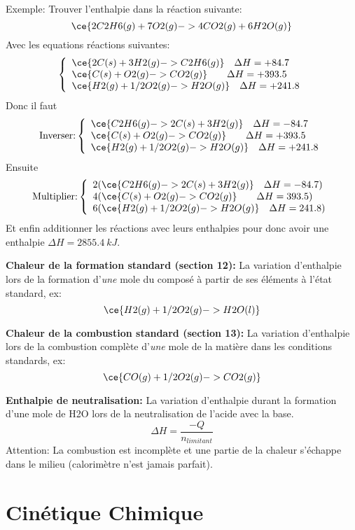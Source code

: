 \documentclass[french, a4paper, 12pt]{article}
\begin{document}
Exemple: Trouver l'enthalpie dans la réaction suivante:
\[
\ce{2C2H6(g) + 7 O2(g) -> 4CO2(g) + 6H2O(g)}
\]
Avec les equations réactions suivantes:
\[
\left\{
	\begin{array}{ll}
		\ce{2C(s) + 3H2(g) -> C2H6(g)}\quad \Delta H=+84.7\\
		\ce{C(s) + O2(g) -> CO2(g)}\qquad \Delta H=+393.5\\
		\ce{H2(g) + 1/2O2 (g) -> H2O(g)} \quad \Delta H=+241.8
	\end{array}
\right.
\]
Donc il faut
\[
\text{Inverser:}\left\{
	\begin{array}{ll}
		\ce{C2H6(g) -> 2C(s) + 3H2(g)}\quad \Delta H=-84.7\\
		\ce{C(s) + O2(g) -> CO2(g)}\qquad \Delta H=+393.5\\
		\ce{H2(g) + 1/2O2 (g) -> H2O(g)} \quad \Delta H=+241.8
	\end{array}
\right.
\]
Ensuite
\[
\text{Multiplier:}\left\{
	\begin{array}{ll}
		2(\ce{C2H6(g) -> 2C(s) + 3H2(g)}\quad \Delta H=-84.7)\\
		4(\ce{C(s) + O2(g) -> CO2(g)}\qquad \Delta H=393.5)\\
		6(\ce{H2(g) + 1/2O2 (g) -> H2O(g)} \quad \Delta H=241.8)
	\end{array}
\right.
\]
Et enfin additionner les réactions avec leurs enthalpies pour donc avoir une enthalpie $\Delta H=\SI{2855.4}{kJ}$.

\vspace{0.5em}
\textbf{Chaleur de la formation standard (section 12):}
La variation d'enthalpie lors de la formation d'\emph{une} mole du composé à partir de ses éléments à l'état standard, ex:
\[
\ce{H2(g) + 1/2O2(g) -> H2O(l)}
\]

\vspace{0.5em}
\textbf{Chaleur de la combustion standard (section 13):}
La variation d'enthalpie lors de la combustion complète d'\emph{une} mole de la matière dans les conditions standards, ex:
\[
\ce{CO(g) + 1/2O2(g) -> CO2 (g)}
\]

\vspace{0.5em}
\textbf{Enthalpie de neutralisation:}
La variation d'enthalpie durant la formation d'une mole de H2O lors de la neutralisation de l'acide avec la base.
\[
\Delta H=\frac{-Q}{n_{limitant}}
\]
Attention: La combustion est incomplète et une partie de la chaleur s'échappe dans le milieu (calorimètre n'est jamais parfait).
\pagebreak

\section{Cinétique Chimique}
\pagebreak
\end{document}
